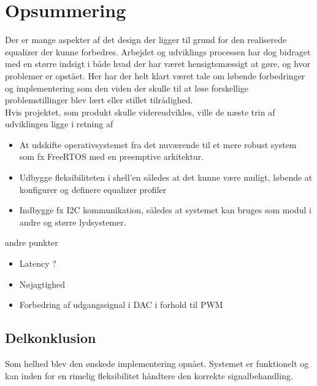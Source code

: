 \section{Opsummering}
Der er mange aspekter af det design der ligger til grund for den realiserede equalizer der kunne forbedres.
Arbejdet og udviklings processen har dog bidraget med en større indsigt i både hvad der har været hensigtsmæssigt at gøre, og hvor problemer er opstået.
Her har der helt klart været tale om løbende forbedringer og implementering som den viden der skulle til at løse forskellige problemstillinger blev lært eller stillet tilrådighed.\\

Hvis projektet, som produkt skulle videreudvikles, ville de næste trin af udviklingen ligge i retning af
\begin{itemize}
	\item At udskifte operativsystemet fra det nuværende til et mere robust system som fx FreeRTOS med en preemptive arkitektur.
	\item Udbygge fleksibiliteten i shell'en således at det kunne være muligt, løbende at konfigurer og definere equalizer profiler
	\item Indbygge fx I2C kommunikation, således at systemet kan bruges som modul i andre og større lydsystemer.
\end{itemize} 

andre punkter
\begin{itemize}
	\item Latency ?
	\item Nøjagtighed
	\item Forbedring af udgangssignal i DAC i forhold til PWM
\end{itemize}

\subsection{Delkonklusion}
Som helhed blev den ønskede implementering opnået.
Systemet er funktionelt og kan inden for en rimelig fleksibilitet håndtere den korrekte signalbehandling.
\\
